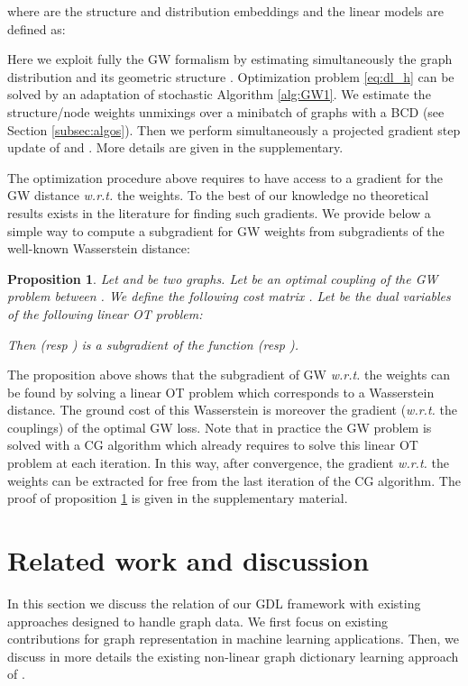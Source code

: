 \documentclass{article}
\newtheorem{proposition}{Proposition}
\begin{document}
	where  are the structure and distribution embeddings and the linear models are defined as:
	
	Here we exploit fully the GW
	formalism by estimating simultaneously the graph distribution 
	and its geometric structure . Optimization problem \ref{eq:dl_h} can
	be solved by an adaptation of stochastic Algorithm \ref{alg:GW1}. We estimate
	the structure/node weights unmixings
	 over a minibatch of graphs with a BCD (see Section
	\ref{subsec:algos}). Then we perform simultaneously a projected gradient step
	update of  and . More details are given in the supplementary.

	The optimization procedure above requires to have access to a gradient for
	the GW distance \emph{w.r.t.} the weights. To the best of our knowledge no
	theoretical results exists in the literature for finding such gradients. We
	provide below a simple way to compute a subgradient for GW weights from subgradients of the well-known Wasserstein distance:
	\begin{proposition}\label{eq:prop3}
		{Let  and  be two graphs. Let  be an optimal coupling of the GW problem between . We define the following cost matrix . Let  be the dual variables of the following linear OT problem:}
		
		Then  (\textit{resp} ) is a subgradient of the function  (\textit{resp} ).
	\end{proposition}
	The proposition above shows that the subgradient of GW \textit{w.r.t.} the
	weights can be found by solving a linear OT problem which corresponds to a Wasserstein distance. The ground cost  of this Wasserstein is moreover the gradient (\textit{w.r.t.} the couplings) of the optimal GW loss.
	Note that in practice the GW problem is solved with a CG algorithm which already
	requires to solve this linear OT problem at each iteration. In this way, after
	convergence, the gradient \textit{w.r.t.} the weights can be extracted for free
	from the last iteration of the CG algorithm. 
	The proof of proposition \ref{eq:prop3} is given in the supplementary material.
	
	\section{Related work and discussion \label{sec:related_work}}
	
	In this section we discuss the relation of our GDL framework with existing
	approaches designed to handle graph data. We first focus on existing contributions
	for graph representation in machine learning applications. Then, we discuss in more details the existing non-linear graph dictionary learning approach of \citep{xu_gromov-wasserstein_2019}.
	
\end{document}

